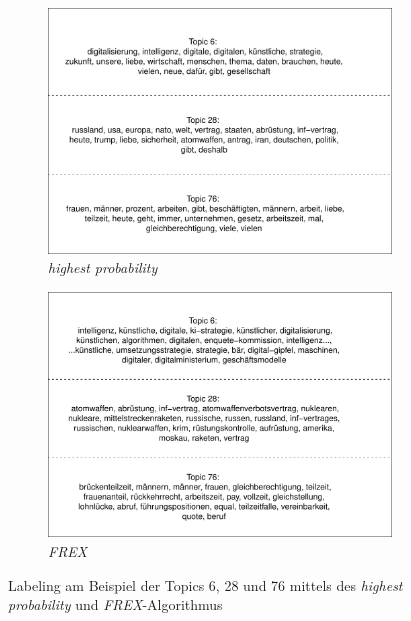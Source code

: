 \documentclass[12pt, 
    twoside=false, 
    bibliography=totoc, 
    numbers=endperiod, 
    headings=normal, 
    toc=chapterentrydotfill
    ]{scrbook}
\begin{document}
\begin{figure}
    \centering
    \begin{subfigure}{.5\textwidth}
      \centering
      \includegraphics[width=.9\linewidth]{images/stm_label_prob_example.pdf}
      \caption{\emph{highest probability}}
      \label{fig:sub1}
    \end{subfigure}%
    \begin{subfigure}{.5\textwidth}
      \centering
      \includegraphics[width=.9\linewidth]{images/stm_label_frex_example.pdf}
      \caption{\emph{FREX}}
      \label{fig:sub2}
    \end{subfigure}
    \caption[Labeling am Beispiel der Topics 6, 28 und 76 mittels des \emph{highest probability} und \emph{FREX}-Algorithmus]{Labeling am Beispiel der Topics 6, 28 und 76 mittels des \emph{highest probability} und \emph{FREX}-Algorithmus}
    \label{fig:example_labels}
\end{figure}
\end{document}
